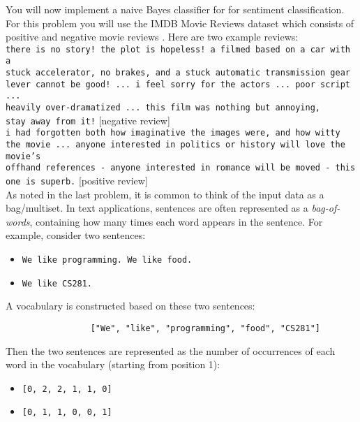 \begin{problem}

\noindent You will now implement a naive Bayes classifier for
for sentiment classification. For this problem you will use
the IMDB Movie Reviews dataset which consists of positive and negative movie reviews . Here are two example reviews:\\

        \texttt{there is no story! the plot is hopeless! a filmed based on a car with a \\
        \indent stuck accelerator, no brakes, and a stuck automatic transmission gear \\
        \indent lever cannot be good! ...  i feel sorry for the actors ... poor script ... \\
        \indent heavily over-dramatized ... this film was nothing but annoying, \\
        \indent stay away from it!} [negative review] \\

        \texttt{i had forgotten both how imaginative the images were, and how witty \\
        \indent the movie ... anyone interested in politics or history will love the movie's \\
        \indent offhand references - anyone interested in romance will be moved - this \\
        \indent one is superb.} [positive review] \\

      \noindent As noted in the last problem, it is common to think of
      the input data as a bag/multiset. In text applications,
      sentences are often represented as a \textit{bag-of-words},
      containing how many times each word appears in the sentence. For
      example, consider two sentences:
\begin{itemize}
\item \begin{verbatim}We like programming. We like food.\end{verbatim}
\item \begin{verbatim}We like CS281.\end{verbatim}
\end{itemize}
A vocabulary is constructed based on these two sentences:
\begin{verbatim}
                 ["We", "like", "programming", "food", "CS281"]
\end{verbatim}
Then the two sentences are represented as the number of occurrences of each word in the vocabulary (starting from position 1):
\begin{itemize}
\item \begin{verbatim}[0, 2, 2, 1, 1, 0]\end{verbatim}
\item \begin{verbatim}[0, 1, 1, 0, 0, 1]\end{verbatim}
\end{itemize}


\end{problem}
